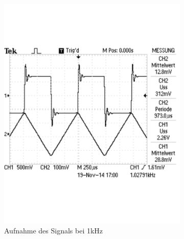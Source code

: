 \documentclass[12pt,a4paper]{article}
\begin{document}
\begin{figure}[H]
\begin{subfigure}[b]{0.28\textwidth}
                \includegraphics[width=\textwidth , scale = 0.4]{2_5_drei_1k.pdf}
                \caption[Aufnahme des Signals bei 1kHz]{Aufnahme des Signals bei 1kHz}
                \label{fig:2_5_drei_1k}
        \end{subfigure}
        \hfill
        \begin{subfigure}[b]{0.28\textwidth}

\end{subfigure}
\end{figure}
\end{document}
